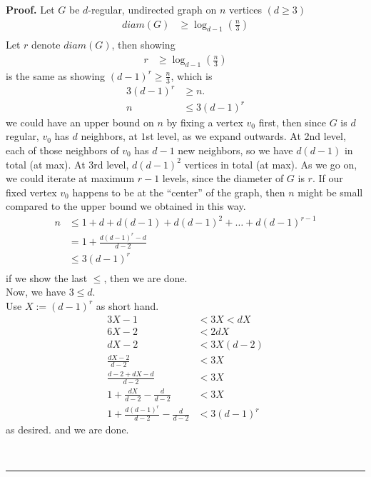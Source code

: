 \documentclass[12pt]{article}%
\newenvironment{proof}[1][Proof]{\textbf{#1.} }{\ \rule{0.5em}{0.5em}}
\begin{document}
\begin{proof}
    Let $G$ be $d$-regular, undirected graph on $n$ vertices $(d \geq 3)$
    \begin{align}
        diam (G) &\geq \log_{d-1} \left( \frac{ n }{ 3 }\right) \\
    \end{align}
    Let $r$ denote $diam(G)$, then showing 
    \begin{align}
        r &\geq \log_{d-1} \left( \frac{ n }{ 3 }\right)
    \end{align}
    is the same as showing $(d-1)^r \geq \frac{ n }{ 3 }$,
    which is 
    \begin{align}
        3(d-1)^r &\geq n.\\
        n &\leq 3 (d-1)^r
    \end{align}
    we could have an upper bound on $n$ by fixing 
    a vertex $v_0$ first, 
    then since $G$ is $d$ regular, $v_0$ has $d$ neighbors,
    at $1$st level, as we expand outwards.
    At 2nd level, each of those neighbors of $v_0$ has
    $d-1$ new neighbors, so we have $d(d-1)$ 
    in total (at max). At 3rd level, $d(d-1)^2$ vertices 
    in total (at max). As we go on, we could iterate at maximum
    $r-1$ levels, since the diameter of $G$ is $r$. 
    If our fixed vertex $v_0$ happens to be at the ``center''
    of the graph, then $n$ might be small compared to the 
    upper bound we obtained in this way.
    \begin{align}
        n &\leq 1 + d + d(d-1) + d(d-1)^2 + \ldots + d(d-1)^{r-1}\\
        &= 1 + \frac{ d(d-1)^r - d }{ d-2 }\\
        &\leq 3(d-1)^r\\
    \end{align}
    if we show the last $\leq$, then we are done.\\
    Now, we have $3 \leq d$.\\
    Use $X := (d-1)^r$ as short hand.\\
    \begin{align}
        3X-1 &< 3X < dX\\
        6X - 2 &< 2dX\\
        dX-2 &< 3X(d-2)\\
        \frac{ dX-2 }{ d-2 } &< 3X \\
        \frac{ d-2 + dX -d }{ d-2 } &< 3X\\
        1 + \frac{ dX }{ d-2 } - \frac{ d }{ d-2 } &< 3X \\
        1 + \frac{ d(d-1)^r }{ d-2 } - \frac{ d }{ d-2 } &< 3 (d-1)^r
    \end{align}
    as desired. and we are done.
    
    
\end{proof}
\end{document}
